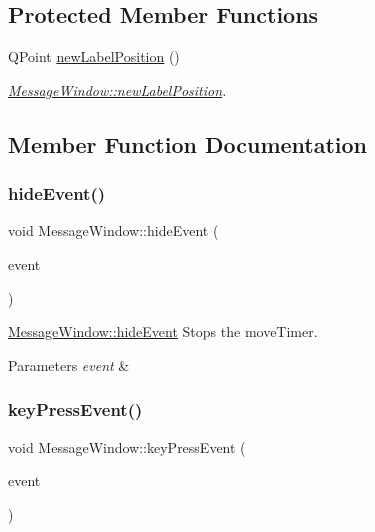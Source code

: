 \subsection*{Protected Member Functions}
\begin{DoxyCompactItemize}
\item 
Q\+Point \mbox{\hyperlink{classMessageWindow_ae2a86d5e5a9a35692303e5c057079dc5}{new\+Label\+Position}} ()
\begin{DoxyCompactList}\small\item\em \mbox{\hyperlink{classMessageWindow_ae2a86d5e5a9a35692303e5c057079dc5}{Message\+Window\+::new\+Label\+Position}}. \end{DoxyCompactList}\end{DoxyCompactItemize}


\subsection{Member Function Documentation}
\mbox{\label{classMessageWindow_aec91ce8e6e2ad404dc79f141fa9ce7b0}} 
\subsubsection{\texorpdfstring{hide\+Event()}{hideEvent()}}
{\footnotesize\ttfamily void Message\+Window\+::hide\+Event (\begin{DoxyParamCaption}\item[{Q\+Hide\+Event $\ast$}]{event }\end{DoxyParamCaption})}



\mbox{\hyperlink{classMessageWindow_aec91ce8e6e2ad404dc79f141fa9ce7b0}{Message\+Window\+::hide\+Event}} Stops the move\+Timer. 


\begin{DoxyParams}{Parameters}
{\em event} & \\
\hline
\end{DoxyParams}
\mbox{\label{classMessageWindow_adc919ddd8974835eb9f44d9cd5362f18}} 
\subsubsection{\texorpdfstring{key\+Press\+Event()}{keyPressEvent()}}
{\footnotesize\ttfamily void Message\+Window\+::key\+Press\+Event (\begin{DoxyParamCaption}\item[{Q\+Key\+Event $\ast$}]{event }\end{DoxyParamCaption})}



